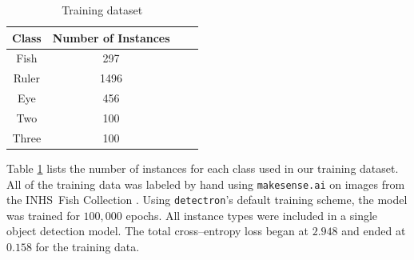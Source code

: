 \documentclass[conference]{IEEEtran}
\begin{document}
\begin{table}[H]
    \centering
      \caption{Training dataset}
    \label{tab:dataset}
    \begin{tabular}{cccc}
        \toprule
        \textbf{Class} & \textbf{Number of Instances}\\
        \midrule
        Fish & 297\\
        Ruler & 1496\\
        Eye & 456\\
        Two & 100\\
        Three & 100\\
      \bottomrule
    \end{tabular}
\end{table}

Table \ref{tab:dataset} lists the number of instances for each class 
used in our training dataset.
All of the training data was labeled by hand using \verb|makesense.ai| \cite{make-sense}
on images from the INHS\ Fish Collection \cite{INHS}.
Using \verb|detectron|'s default training scheme, the model was trained for \(100,000\) epochs. All instance types were included in a single object detection model. The total cross--entropy loss began at \(2.948\) and ended at \(0.158\) for the training data.
\end{document}
